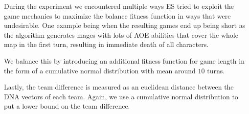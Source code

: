 
During the experiment we encountered multiple ways ES tried to exploit the
game mechanics to maximize the balance fitness function in ways that were
undesirable. One example being when the resulting games end up being short
as the algorithm generates mages with lots of AOE abilities that cover the
whole map in the first turn, resulting in immediate death of all characters.

We balance this by introducing an additional fitness function for game length
in the form of a cumulative normal distribution with mean around $10$ turns.

Lastly, the team difference is measured as an euclidean distance between the DNA
vectors of each team. Again, we use a cumulative normal distribution to put a lower
bound on the team difference.
